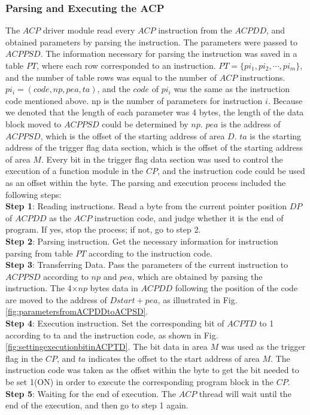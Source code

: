 \documentclass[journal]{IEEEtran}
\begin{document}
\subsubsection{Parsing and Executing the ACP}
The $ACP$ driver module read every $ACP$ instruction from the $ACPDD$, and obtained parameters by parsing the instruction. The parameters were passed to $ACPPSD$.
The information necessary for parsing the instruction was saved in a table $PT$, where each row corresponded to an instruction. $PT=\{pi_1,pi_2, \cdots ,pi_m\}$, and the number of table rows was equal to the number of  $ACP$ instructions. $pi_i=(code,np,pea,ta)$, and the $code$ of $pi_i$ was the same as the instruction code mentioned above. np is the number of parameters for instruction $i$. Because we denoted that the length of each parameter was 4 bytes, the length of the data block moved to $ACPPSD$ could be determined by $np$. $pea$ is the address of $ACPPSD$, which is the offset of the starting address of area $D$. $ta$ is the starting address of the trigger flag data section, which is the offset of the starting address of area $M$. Every bit in the trigger flag data section was used to control the execution of a function module in the $CP$, and the instruction code could be used as an offset within the byte.
The parsing and execution process included the following steps:\\
\textbf{Step 1}: Reading instructions. Read a byte from the current pointer position $DP$ of $ACPDD$ as the $ACP$ instruction code, and judge whether it is the end of program. If yes, stop the process; if not, go to step 2.\\
\textbf{Step 2}: Parsing instruction. Get the necessary information for instruction parsing from table $PT$ according to the instruction code.\\
\textbf{Step 3}: Transferring Data. Pass the parameters of the current instruction to $ACPPSD$ according to $np$ and $pea$, which are obtained by parsing the instruction. The 4$\times np$ bytes data in $ACPDD$ following the position of the code are moved to the address of $Dstart+pea$, as illustrated in Fig.\ref{fig:parametersfromACPDDtoACPSD}.\\
\textbf{Step 4}: Execution instruction. Set the corresponding bit of $ACPTD$ to 1 according to ta and the instruction code, as shown in Fig.\ref{fig:settingexecutionbitinACPTD}. The bit data in area $M$ was used as the trigger flag in the $CP$, and $ta$ indicates the offset to the start address of area $M$. The instruction code was taken as the offset within the byte to get the bit needed to be set 1(ON) in order to execute the corresponding program block in the $CP$.\\
\textbf{Step 5}: Waiting for the end of execution. The $ACP$ thread will wait until the end of the execution, and then go to step 1 again.
\end{document}
